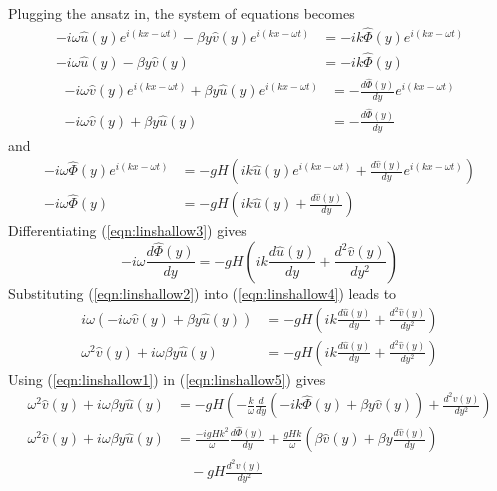\begin{solution}
Plugging the ansatz in, the system of equations becomes
\begin{align}
-i\omega \hat{u}(y) e^{i(kx-\omega t)} - \beta y \hat{v}(y)e^{i(kx-\omega t)} &= -i k \hat{\Phi}(y)e^{i(kx-\omega t)} \nonumber\\
-i\omega \hat{u}(y) - \beta y \hat{v}(y) &= -i k \hat{\Phi}(y) \label{eqn:linshallow1}
\end{align}
\begin{align}
-i\omega \hat{v}(y)e^{i(kx-\omega t)} + \beta y \hat{u}(y)e^{i(kx-\omega t)} &= -\frac{d\hat{\Phi}(y)}{dy}e^{i(kx-\omega t)} \nonumber\\
-i\omega \hat{v}(y) + \beta y \hat{u}(y) &= -\frac{d\hat{\Phi}(y)}{dy} \label{eqn:linshallow2}
\end{align}
and
\begin{align}
-i\omega \hat{\Phi}(y)e^{i(kx-\omega t)} &= - gH\left(i k\hat{u}(y)e^{i(kx-\omega t)} + \frac{d\hat{v}(y)}{dy}e^{i(kx-\omega t)}\right) \nonumber\\
-i\omega \hat{\Phi}(y) &= - gH(i k\hat{u}(y) + \frac{d\hat{v}(y)}{dy}) \label{eqn:linshallow3} 
\end{align}
Differentiating (\ref{eqn:linshallow3}) gives
\begin{equation}
-i\omega \frac{d\hat{\Phi}(y)}{dy} = - gH(i k\frac{d\hat{u}(y)}{dy} + \frac{d^2\hat{v}(y)}{dy^2}) \label{eqn:linshallow4}      
\end{equation}
Substituting (\ref{eqn:linshallow2}) into (\ref{eqn:linshallow4}) leads to
\begin{align}
i\omega (-i\omega \hat{v}(y) + \beta y \hat{u}(y)) &= - gH(i k\frac{d\hat{u}(y)}{dy} + \frac{d^2\hat{v}(y)}{dy^2}) \nonumber \\
\omega^2 \hat{v}(y) + i \omega\beta y \hat{u}(y) &= - gH(i k\frac{d\hat{u}(y)}{dy} + \frac{d^2\hat{v}(y)}{dy^2}) \label{eqn:linshallow5}   
\end{align}
Using (\ref{eqn:linshallow1}) in (\ref{eqn:linshallow5}) gives
\begin{align}
\omega^2 \hat{v}(y) + i \omega\beta y \hat{u}(y) &= -gH(-\frac{k}{\omega} \frac{d}{dy} (-i k \hat{\Phi}(y) + \beta y\hat{v}(y)) + \frac{d^2\hat{v}(y)}{dy^2}) \nonumber \\
\omega^2 \hat{v}(y) + i \omega\beta y \hat{u}(y) &= 
\frac{-i gHk^2}{\omega}\frac{d\hat{\Phi}(y)}{dy} + \frac{gHk}{\omega}(\beta\hat{v}(y) + \beta y\frac{d\hat{v}(y)}{dy}) \nonumber \\ 
&\quad- gH \frac{d^2\hat{v}(y)}{dy^2}   \label{eqn:linshallow6}   

\end{align}
\end{solution}
